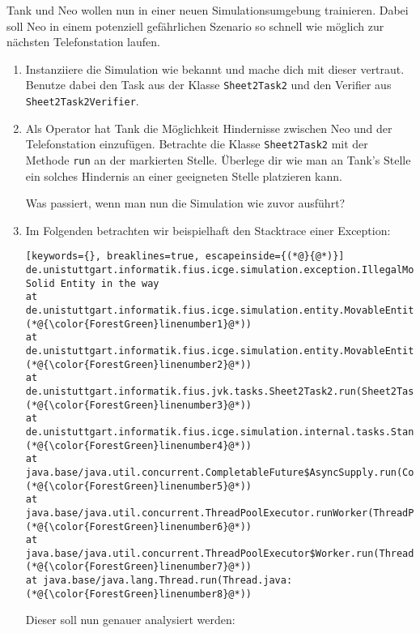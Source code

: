 Tank und Neo wollen nun in einer neuen Simulationsumgebung trainieren. 
Dabei soll Neo in einem potenziell gefährlichen Szenario so schnell wie möglich zur nächsten Telefonstation laufen.
\begin{enumerate}[label=\alph*)]
    \item Instanziiere die Simulation wie bekannt und mache dich mit dieser vertraut. Benutze dabei den Task aus der Klasse \lstinline{Sheet2Task2}
    und den Verifier aus \lstinline{Sheet2Task2Verifier}.
    \item Als Operator hat Tank die Möglichkeit Hindernisse zwischen Neo und der Telefonstation einzufügen.
    Betrachte die Klasse \lstinline{Sheet2Task2} mit der Methode \lstinline{run} an der markierten Stelle. Überlege dir wie man an Tank's Stelle 
    ein solches Hindernis an einer geeigneten Stelle platzieren kann.\par
    Was passiert, wenn man nun die Simulation wie zuvor ausführt?
    \item Im Folgenden betrachten wir beispielhaft den Stacktrace einer Exception:
    \begin{lstlisting}[keywords={}, breaklines=true, escapeinside={(*@}{@*)}]
de.unistuttgart.informatik.fius.icge.simulation.exception.IllegalMoveException: Solid Entity in the way
at de.unistuttgart.informatik.fius.icge.simulation.entity.MovableEntity.internalMove(MovableEntity.java:(*@{\color{ForestGreen}linenumber1}@*))
at de.unistuttgart.informatik.fius.icge.simulation.entity.MovableEntity.move(MovableEntity.java:(*@{\color{ForestGreen}linenumber2}@*))
at de.unistuttgart.informatik.fius.jvk.tasks.Sheet2Task2.run(Sheet2Task2.java:(*@{\color{ForestGreen}linenumber3}@*))
at de.unistuttgart.informatik.fius.icge.simulation.internal.tasks.StandardTaskRunner.executeTask(StandardTaskRunner.java:(*@{\color{ForestGreen}linenumber4}@*))
at java.base/java.util.concurrent.CompletableFuture$AsyncSupply.run(CompletableFuture.java:(*@{\color{ForestGreen}linenumber5}@*))
at java.base/java.util.concurrent.ThreadPoolExecutor.runWorker(ThreadPoolExecutor.java:(*@{\color{ForestGreen}linenumber6}@*))
at java.base/java.util.concurrent.ThreadPoolExecutor$Worker.run(ThreadPoolExecutor.java:(*@{\color{ForestGreen}linenumber7}@*))
at java.base/java.lang.Thread.run(Thread.java:(*@{\color{ForestGreen}linenumber8}@*))
    \end{lstlisting}
    Dieser soll nun genauer analysiert werden:
    \begin{enumerate}

\end{enumerate}
\end{enumerate}
